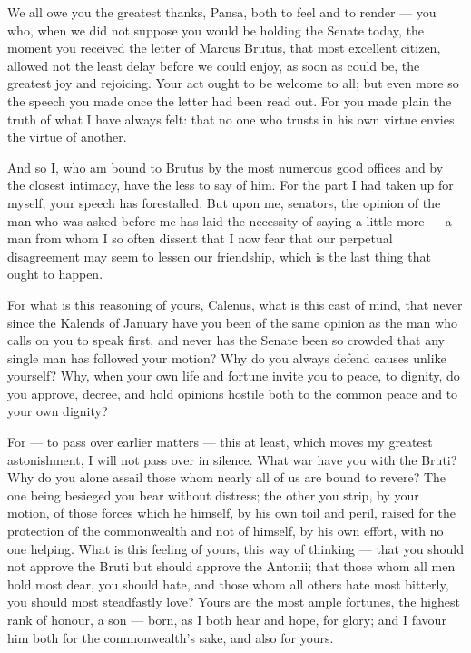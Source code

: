
 We all owe you the greatest thanks, Pansa, both to feel and to render --- you who, when we did not suppose you would be holding the Senate today, the moment you received the letter of Marcus Brutus, that most excellent citizen, allowed not the least delay before we could enjoy, as soon as could be, the greatest joy and rejoicing. Your act ought to be welcome to all; but even more so the speech you made once the letter had been read out. For you made plain the truth of what I have always felt: that no one who trusts in his own virtue envies the virtue of another.

 And so I, who am bound to Brutus by the most numerous good offices and by the closest intimacy, have the less to say of him. For the part I had taken up for myself, your speech has forestalled. But upon me, senators, the opinion of the man who was asked before me has laid the necessity of saying a little more --- a man from whom I so often dissent that I now fear that our perpetual disagreement may seem to lessen our friendship, which is the last thing that ought to happen.

 For what is this reasoning of yours, Calenus, what is this cast of mind, that never since the Kalends of January have you been of the same opinion as the man who calls on you to speak first, and never has the Senate been so crowded that any single man has followed your motion? Why do you always defend causes unlike yourself? Why, when your own life and fortune invite you to peace, to dignity, do you approve, decree, and hold opinions hostile both to the common peace and to your own dignity?

 For --- to pass over earlier matters --- this at least, which moves my greatest astonishment, I will not pass over in silence. What war have you with the Bruti? Why do you alone assail those whom nearly all of us are bound to revere? The one being besieged you bear without distress; the other you strip, by your motion, of those forces which he himself, by his own toil and peril, raised for the protection of the commonwealth and not of himself, by his own effort, with no one helping. What is this feeling of yours, this way of thinking --- that you should not approve the Bruti but should approve the Antonii; that those whom all men hold most dear, you should hate, and those whom all others hate most bitterly, you should most steadfastly love? Yours are the most ample fortunes, the highest rank of honour, a son --- born, as I both hear and hope, for glory; and I favour him both for the commonwealth's sake, and also for yours.

